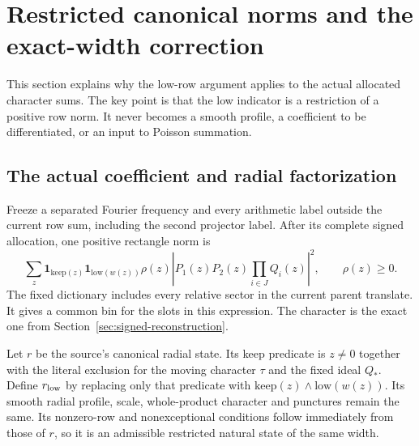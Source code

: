 \section{Restricted canonical norms and the exact-width correction}
\label{sec:restricted-canonical}

This section explains why the low-row argument applies to the actual
allocated character sums. The key point is that the low indicator is a
restriction of a positive row norm. It never becomes a smooth profile,
a coefficient to be differentiated, or an input to Poisson summation.

\subsection{The actual coefficient and radial factorization}
Freeze a separated Fourier frequency and every arithmetic label outside
the current row sum, including the second projector label. After its
complete signed allocation, one positive rectangle norm is
\[
 \sum_z\mathbf1_{\mathrm{keep}(z)}\mathbf1_{\mathrm{low}(w(z))}
       \rho(z)\left|P_1(z)P_2(z)\prod_{i\in J}Q_i(z)\right|^2,
 \qquad \rho(z)\ge0.
\]
The fixed dictionary includes every relative sector in the current
parent translate. It gives a common bin for the slots in this expression.
The character is the exact one from Section~\ref{sec:signed-reconstruction}.

Let $r$ be the source's canonical radial state. Its keep predicate is
$z\ne0$ together with the literal exclusion for the moving character
$\tau$ and the fixed ideal $Q_*$. Define $r_{\rm low}$ by replacing only
that predicate with
$\mathrm{keep}(z)\wedge\mathrm{low}(w(z))$.
Its smooth radial profile, scale, whole-product character and punctures
remain the same. Its nonzero-row and nonexceptional conditions follow
immediately from those of $r$, so it is an admissible restricted natural
state of the same width.

